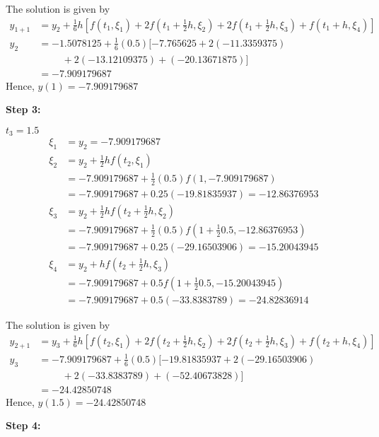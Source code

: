\documentclass[12pt,a4paper]{article}
\begin{document}
The solution is given by 
\begin{align*}
y_{1+1} &= y_2 + \frac{1}{6}h\left[ f(t_1 , \xi_1 ) + 2f(t_1 + \frac{1}{2} h , \xi_2) + 2f(t_1 + \frac{1}{2} h , \xi_3 ) + f(t_1 + h , \xi_4) \right] \\
y_2 &= -1.5078125 + \frac{1}{6}(0.5)[ -7.765625 + 2(-11.3359375)\\
&\hspace{1cm} + 2( -13.12109375 ) + (-20.13671875)] \\
&= -7.909179687
\end{align*}
Hence, \quad $y(1) = -7.909179687$

\noindent
\textbf{Step 3:}

$ t_3 = 1.5 $
\begin{align*}
\xi_1 &= y_2 = -7.909179687 \\
\xi_2 &= y_2 + \frac{1}{2}hf(t_2,\xi_1) \\
&= -7.909179687 + \frac{1}{2}(0.5)f(1,-7.909179687)\\
&= -7.909179687 + 0.25(-19.81835937) = -12.86376953 \\
\xi_3 &= y_2 + \frac{1}{2}hf\left( t_2 + \frac{1}{2}h, \xi_2 \right)  \\
&= -7.909179687 + \frac{1}{2}(0.5)f\left( 1 + \frac{1}{2}0.5, -12.86376953 \right)  \\
&= -7.909179687 + 0.25(-29.16503906) = -15.20043945  \\
\xi_4 &= y_2 + hf\left( t_2 + \frac{1}{2}h, \xi_3\right) \\
&= -7.909179687 + 0.5f\left( 1 + \frac{1}{2}0.5, -15.20043945\right) \\
&= -7.909179687 + 0.5(-33.8383789) = -24.82836914
\end{align*}

The solution is given by 
\begin{align*}
y_{2+1} &= y_3 + \frac{1}{6}h [ f(t_2 , \xi_1 ) + 2f(t_2 + \frac{1}{2} h , \xi_2) + 2f(t_2 + \frac{1}{2} h , \xi_3 ) + f(t_2 + h , \xi_4)] \\
y_3 &= -7.909179687 + \frac{1}{6}(0.5)[ -19.81835937 + 2(-29.16503906) \\
&\hspace{1cm}+ 2( -33.8383789 ) + (-52.40673828)] \\
&= -24.42850748
\end{align*}
Hence, \quad $y(1.5) = -24.42850748$

\noindent
\textbf{Step 4:}
\end{document}
